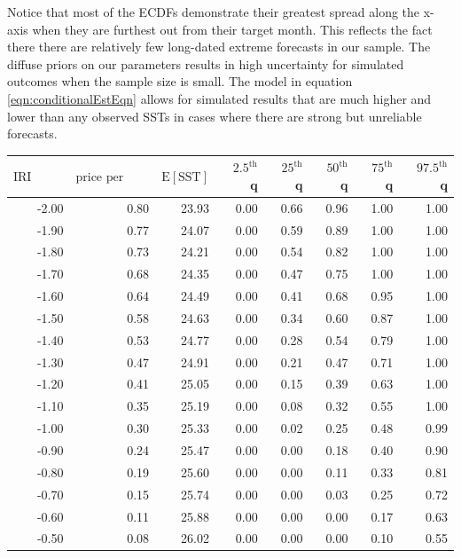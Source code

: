 \documentclass[article]{jss}
\begin{document}
Notice that most of the ECDFs demonstrate their greatest spread along
the x-axis when they are furthest out from their target month. This
reflects the fact there there are relatively few long-dated extreme
forecasts in our sample. The diffuse priors on our parameters results in
high uncertainty for simulated outcomes when the sample size is small.
The model in equation \ref{eqn:conditionalEstEqn} allows for simulated
results that are much higher and lower than any observed SSTs in cases
where there are strong but unreliable forecasts.

\begin{table}[!htbp]
\centering \footnotesize
\begin{tabular}{rrrrrrrr}
  \hline
$\mbox{IRI anom}$ & $\mbox{price per USD}$ & $\mbox{E}[\mbox{SST}]$ & $2.5^{\mbox{th}}$ q & $25^{\mbox{th}}$ q & $50^{\mbox{th}}$ q & $75^{\mbox{th}}$ q & $97.5^{\mbox{th}}$ q \\ 
  \hline
-2.00 & 0.80 & 23.93 & 0.00 & 0.66 & 0.96 & 1.00 & 1.00 \\ 
  -1.90 & 0.77 & 24.07 & 0.00 & 0.59 & 0.89 & 1.00 & 1.00 \\ 
  -1.80 & 0.73 & 24.21 & 0.00 & 0.54 & 0.82 & 1.00 & 1.00 \\ 
  -1.70 & 0.68 & 24.35 & 0.00 & 0.47 & 0.75 & 1.00 & 1.00 \\ 
  -1.60 & 0.64 & 24.49 & 0.00 & 0.41 & 0.68 & 0.95 & 1.00 \\ 
  -1.50 & 0.58 & 24.63 & 0.00 & 0.34 & 0.60 & 0.87 & 1.00 \\ 
  -1.40 & 0.53 & 24.77 & 0.00 & 0.28 & 0.54 & 0.79 & 1.00 \\ 
  -1.30 & 0.47 & 24.91 & 0.00 & 0.21 & 0.47 & 0.71 & 1.00 \\ 
  -1.20 & 0.41 & 25.05 & 0.00 & 0.15 & 0.39 & 0.63 & 1.00 \\ 
  -1.10 & 0.35 & 25.19 & 0.00 & 0.08 & 0.32 & 0.55 & 1.00 \\ 
  -1.00 & 0.30 & 25.33 & 0.00 & 0.02 & 0.25 & 0.48 & 0.99 \\ 
  -0.90 & 0.24 & 25.47 & 0.00 & 0.00 & 0.18 & 0.40 & 0.90 \\ 
  -0.80 & 0.19 & 25.60 & 0.00 & 0.00 & 0.11 & 0.33 & 0.81 \\ 
  -0.70 & 0.15 & 25.74 & 0.00 & 0.00 & 0.03 & 0.25 & 0.72 \\ 
  -0.60 & 0.11 & 25.88 & 0.00 & 0.00 & 0.00 & 0.17 & 0.63 \\ 
  -0.50 & 0.08 & 26.02 & 0.00 & 0.00 & 0.00 & 0.10 & 0.55 \\ 

\end{tabular}
\end{table}
\end{document}
